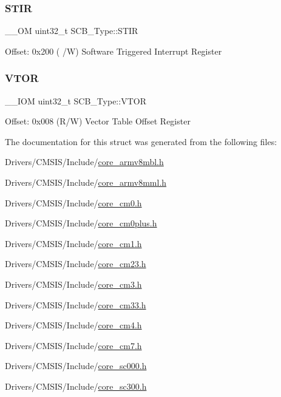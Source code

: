 \subsubsection{\texorpdfstring{STIR}{STIR}}
{\footnotesize\ttfamily \+\_\+\+\_\+\+OM uint32\+\_\+t S\+C\+B\+\_\+\+Type\+::\+S\+T\+IR}

Offset\+: 0x200 ( /W) Software Triggered Interrupt Register \mbox{\label{struct_s_c_b___type_a187a4578e920544ed967f98020fb8170}} 
\subsubsection{\texorpdfstring{VTOR}{VTOR}}
{\footnotesize\ttfamily \+\_\+\+\_\+\+I\+OM uint32\+\_\+t S\+C\+B\+\_\+\+Type\+::\+V\+T\+OR}

Offset\+: 0x008 (R/W) Vector Table Offset Register 

The documentation for this struct was generated from the following files\+:\begin{DoxyCompactItemize}
\item 
Drivers/\+C\+M\+S\+I\+S/\+Include/\mbox{\hyperlink{core__armv8mbl_8h}{core\+\_\+armv8mbl.\+h}}\item 
Drivers/\+C\+M\+S\+I\+S/\+Include/\mbox{\hyperlink{core__armv8mml_8h}{core\+\_\+armv8mml.\+h}}\item 
Drivers/\+C\+M\+S\+I\+S/\+Include/\mbox{\hyperlink{core__cm0_8h}{core\+\_\+cm0.\+h}}\item 
Drivers/\+C\+M\+S\+I\+S/\+Include/\mbox{\hyperlink{core__cm0plus_8h}{core\+\_\+cm0plus.\+h}}\item 
Drivers/\+C\+M\+S\+I\+S/\+Include/\mbox{\hyperlink{core__cm1_8h}{core\+\_\+cm1.\+h}}\item 
Drivers/\+C\+M\+S\+I\+S/\+Include/\mbox{\hyperlink{core__cm23_8h}{core\+\_\+cm23.\+h}}\item 
Drivers/\+C\+M\+S\+I\+S/\+Include/\mbox{\hyperlink{core__cm3_8h}{core\+\_\+cm3.\+h}}\item 
Drivers/\+C\+M\+S\+I\+S/\+Include/\mbox{\hyperlink{core__cm33_8h}{core\+\_\+cm33.\+h}}\item 
Drivers/\+C\+M\+S\+I\+S/\+Include/\mbox{\hyperlink{core__cm4_8h}{core\+\_\+cm4.\+h}}\item 
Drivers/\+C\+M\+S\+I\+S/\+Include/\mbox{\hyperlink{core__cm7_8h}{core\+\_\+cm7.\+h}}\item 
Drivers/\+C\+M\+S\+I\+S/\+Include/\mbox{\hyperlink{core__sc000_8h}{core\+\_\+sc000.\+h}}\item 
Drivers/\+C\+M\+S\+I\+S/\+Include/\mbox{\hyperlink{core__sc300_8h}{core\+\_\+sc300.\+h}}\end{DoxyCompactItemize}

